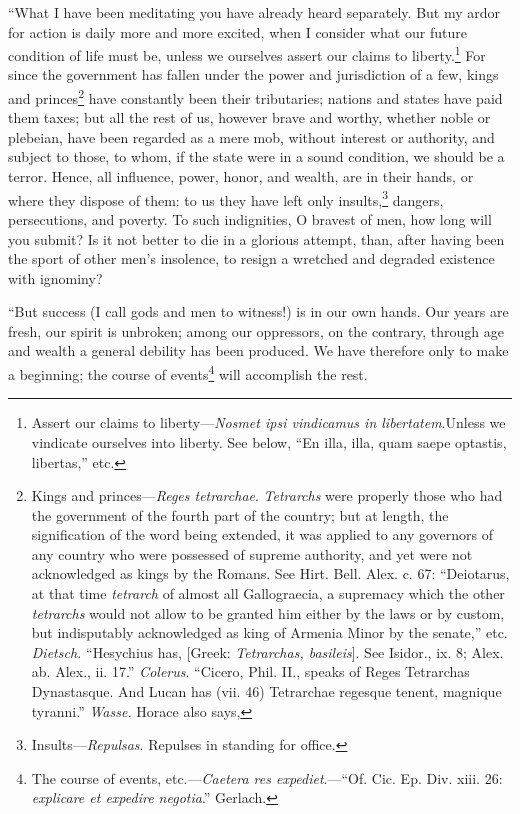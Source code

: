 ``What I have been meditating you have already heard separately. But my
ardor for action is daily more and more excited, when I consider what
our future condition of life must be, unless we ourselves assert our
claims to liberty.\footnote{Assert our claims to liberty—\emph{Nosmet ipsi vindicamus in
libertatem}.Unless we vindicate ourselves into liberty. See below,
``En illa, illa, quam saepe optastis, libertas,'' etc.} For since the government has fallen under the
power and jurisdiction of a few, kings and princes\footnote{Kings and princes—\emph{Reges tetrarchae}. \emph{Tetrarchs} were
properly those who had the government of the fourth part of the
country; but at length, the signification of the word being extended,
it was applied to any governors of any country who were possessed of
supreme authority, and yet were not acknowledged as kings by the
Romans. See Hirt. Bell. Alex. c. 67: ``Deiotarus, at that time
\emph{tetrarch} of almost all Gallograecia, a supremacy which the other
\emph{tetrarchs} would not allow to be granted him either by the laws or by
custom, but indisputably acknowledged as king of Armenia Minor by the
senate,'' etc. \emph{Dietsch.} ``Hesychius has, [Greek: \emph{Tetrarchas,
basileis}]. See Isidor., ix. 8; Alex. ab. Alex., ii. 17.'' \emph{Colerus}.
``Cicero, Phil. II., speaks of Reges Tetrarchas Dynastasque. And Lucan
has (vii. 46) Tetrarchae regesque tenent, magnique tyranni.'' \emph{Wasse.}
Horace also says,} have constantly
been their tributaries; nations and states have paid them taxes; but all
the rest of us, however brave and worthy, whether noble or plebeian,
have been regarded as a mere mob, without interest or authority, and
subject to those, to whom, if the state were in a sound condition, we
should be a terror. Hence, all influence, power, honor, and wealth, are
in their hands, or where they dispose of them: to us they have left only
insults,\footnote{Insults—\emph{Repulsas}. Repulses in standing for office.} dangers, persecutions, and poverty. To such indignities,
O bravest of men, how long will you submit? Is it not better to die in
a glorious attempt, than, after having been the sport of other men's
insolence, to resign a wretched and degraded existence with ignominy?

``But success (I call gods and men to witness!) is in our own hands.
Our years are fresh, our spirit is unbroken; among our oppressors, on
the contrary, through age and wealth a general debility has been
produced. We have therefore only to make a beginning; the course of
events\footnote{The course of events, etc.—\emph{Caetera res expediet}.—``Of. Cic.
Ep. Div. xiii. 26: \emph{explicare et expedire negotia}.'' Gerlach.} will accomplish the rest.

